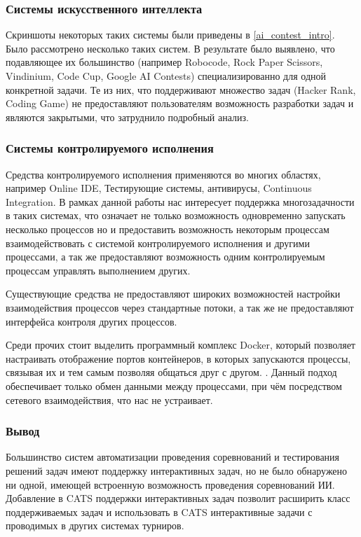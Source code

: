 \documentclass{imcs}
\begin{document}
\subsubsection{Системы искусственного интеллекта}
Скриншоты некоторых таких системы были приведены в \ref{ai_contest_intro}. Было рассмотрено несколько таких систем. В результате было выявлено, что подавляющее их большинство (например Robocode\cite{robocode}, Rock Paper Scissors\cite{rockpaperscissors}, Vindinium\cite{vindinium}, Code Cup\cite{codecup}, Google AI Contests) специализированно для одной конкретной задачи. Те из них, что поддерживают множество задач (Hacker Rank\cite{hackerrank}, Coding Game\cite{codingame}) не предоставляют пользователям возможность разработки задач и являются закрытыми, что затруднило подробный анализ.

\subsubsection{Системы контролируемого исполнения}
Средства контролируемого исполнения применяются во многих областях, например Online IDE, Тестирующие системы, антивирусы, Continuous Integration. В рамках данной работы нас интересует поддержка многозадачности в таких системах, что означает не только возможность одновременно запускать несколько процессов но и предоставить возможность некоторым процессам взаимодействовать с системой контролируемого исполнения и другими процессами, а так же предоставляют возможность одним контролируемым процессам управлять выполнением других.

Существующие средства не предоставляют широких возможностей настройки взаимодействия процессов через стандартные потоки, а так же не предоставляют интерфейса контроля других процессов.

Среди прочих стоит выделить программный комплекс Docker, который позволяет настраивать отображение портов контейнеров, в которых запускаются процессы, связывая их и тем самым позволяя общаться друг с другом. \cite{docker}. Данный подход обеспечивает только обмен данными между процессами, при чём посредством сетевого взаимодействия, что нас не устраивает.

\subsubsection{Вывод}

Большинство систем автоматизации проведения соревнований и тестирования решений задач имеют поддержку интерактивных задач, но не было обнаружено ни одной, имеющей встроенную возможность проведения соревнований ИИ. Добавление в CATS поддержки интерактивных задач позволит расширить класс поддерживаемых задач и использовать в CATS интерактивные задачи с проводимых в других системах турниров.
\end{document}
